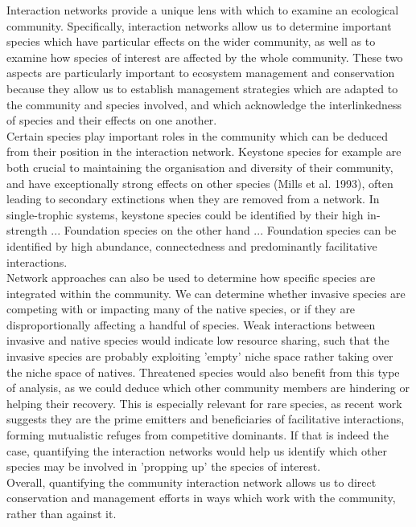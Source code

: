 \documentclass[a4,12pt]{article}
\begin{document}
        Interaction networks provide a unique lens with which to examine an ecological community. Specifically, interaction networks allow us to determine important species which have particular effects on the wider community, as well as to examine how species of interest are affected by the whole community. These two aspects are particularly important to ecosystem management and conservation because they allow us to establish management strategies which are adapted to the community and species involved, and which acknowledge the interlinkedness of species and their effects on one another.  \\

        Certain species play important roles in the community which can be deduced from their position in the interaction network. Keystone species for example are both crucial to maintaining the organisation and diversity of their community, and have exceptionally strong effects on other species (Mills et al. 1993), often leading to secondary extinctions when they are removed from a network. In single-trophic systems, keystone species could be identified by their high in-strength ... Foundation species on the other hand ... Foundation species can be identified by high abundance, connectedness and predominantly facilitative interactions. \\

        Network approaches can also be used to determine how specific species are integrated within the community. We can determine whether invasive species are competing with or impacting many of the native species, or if they are disproportionally affecting a handful of species. Weak interactions between invasive and native species would indicate low resource sharing, such that the invasive species are probably exploiting 'empty' niche space rather taking over the niche space of natives. Threatened species would also benefit from this type of analysis, as we could deduce which other community members are hindering or helping their recovery. This is especially relevant for rare species, as recent work suggests they are the prime emitters and beneficiaries of facilitative interactions, forming mutualistic refuges from competitive dominants. If that is indeed the case, quantifying the interaction networks would help us identify which other species may be involved in 'propping up' the species of interest.  \\

        Overall, quantifying the community interaction network allows us to direct conservation and management efforts in ways which work with the community, rather than against it.
\end{document}
